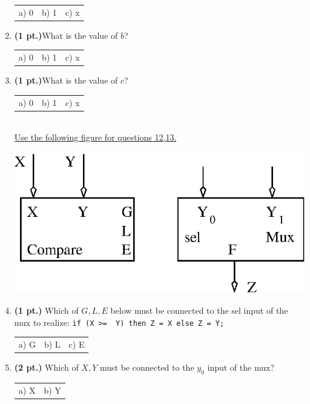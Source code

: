 \documentclass{article}
\begin{document}
\begin{enumerate}
\begin{tabular}{p{0.6in} p{0.6in} p{0.6in}}
a) 0 & b) 1 & c) x 
\end{tabular}

\item {\bf (1 pt.)}What is the value of $b$?

\begin{tabular}{p{0.6in} p{0.6in} p{0.6in}}
a) 0 & b) 1 & c) x 
\end{tabular}

\item {\bf (1 pt.)}What is the value of $c$?

\begin{tabular}{p{0.6in} p{0.6in} p{0.6in}}
a) 0 & b) 1 & c) x 
\end{tabular} \\

\underline{ Use the following figure for questions 12,13.}

\includegraphics{./Fig2/compare2}

\item {\bf (1 pt.)} Which of $G,L,E$ below must be connected to the
sel input of the mux to realize: \verb+if (X >=  Y) then Z = X else Z = Y;+

\begin{tabular}{p{0.6in} p{0.6in} l}
a) G & b) L & c) E 
\end{tabular}


\item {\bf (2 pt.)} Which of $X,Y$ must be connected to the $y_0$ input
of the mux?

\begin{tabular}{p{0.6in} l}
a) X & b) Y  
\end{tabular}


\end{enumerate}
\end{document}
